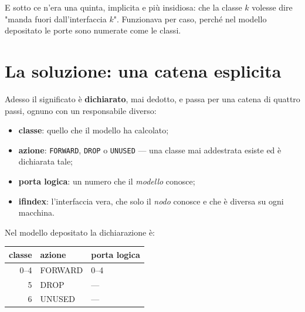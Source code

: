 \documentclass[11pt,a4paper,oneside]{report}
\begin{document}
E sotto ce n'era una quinta, implicita e più insidiosa: che la classe $k$
volesse dire "manda fuori dall'interfaccia $k$". Funzionava per caso, perché nel
modello depositato le porte sono numerate come le classi.

\section{La soluzione: una catena esplicita}

Adesso il significato è \textbf{dichiarato}, mai dedotto, e passa per una
catena di quattro passi, ognuno con un responsabile diverso:

\begin{center}
\end{center}

\begin{itemize}
\item \textbf{classe}: quello che il modello ha calcolato;
\item \textbf{azione}: \texttt{FORWARD}, \texttt{DROP} o \texttt{UNUSED} --- una
      classe mai addestrata esiste ed è dichiarata tale;
\item \textbf{porta logica}: un numero che il \emph{modello} conosce;
\item \textbf{ifindex}: l'interfaccia vera, che solo il \emph{nodo} conosce e
      che è diversa su ogni macchina.
\end{itemize}

Nel modello depositato la dichiarazione è:

\begin{center}
\small
\begin{tabular}{@{}rll@{}}
\toprule
\textbf{classe} & \textbf{azione} & \textbf{porta logica} \\
\midrule
0--4 & FORWARD & 0--4 \\
5    & DROP    & --- \\
6    & UNUSED  & --- \\
\bottomrule
\end{tabular}
\end{center}
\end{document}

